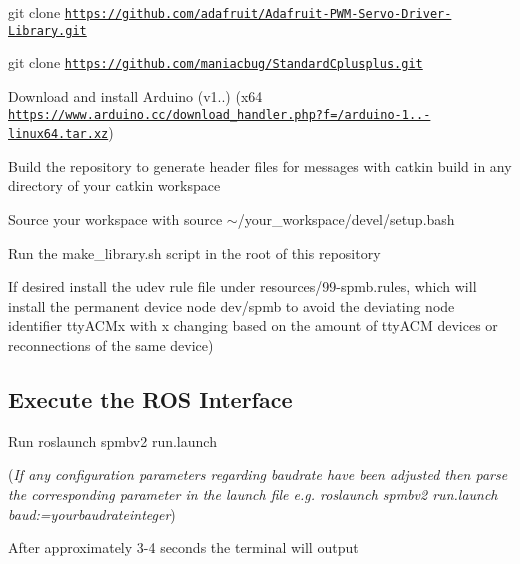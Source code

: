 \begin{DoxyItemize}
\item {\ttfamily git clone \href{https://github.com/adafruit/Adafruit-PWM-Servo-Driver-Library.git}{\tt https\+://github.\+com/adafruit/\+Adafruit-\/\+P\+W\+M-\/\+Servo-\/\+Driver-\/\+Library.\+git}}
\item {\ttfamily git clone \href{https://github.com/maniacbug/StandardCplusplus.git}{\tt https\+://github.\+com/maniacbug/\+Standard\+Cplusplus.\+git}}
\item Download and install Arduino (v1..) (x64 \href{https://www.arduino.cc/download_handler.php?f=/arduino-1.8.5-linux64.tar.xz}{\tt https\+://www.\+arduino.\+cc/download\+\_\+handler.\+php?f=/arduino-\/1..-\/linux64.\+tar.\+xz})
\item Build the repository to generate header files for messages with {\ttfamily catkin build} in any directory of your catkin workspace
\item Source your workspace with {\ttfamily source $\sim$/your\+\_\+workspace/devel/setup.bash}
\item Run the {\ttfamily make\+\_\+library.\+sh} script in the root of this repository
\item If desired install the udev rule file under {\ttfamily resources/99-\/spmb.\+rules}, which will install the permanent device node {\ttfamily dev/spmb} to avoid the deviating node identifier tty\+A\+C\+Mx with x changing based on the amount of tty\+A\+CM devices or reconnections of the same device)
\end{DoxyItemize}

\subsection*{Execute the R\+OS Interface}


\begin{DoxyItemize}
\item Run {\ttfamily roslaunch spmbv2 run.\+launch}
\end{DoxyItemize}

({\itshape If any configuration parameters regarding baudrate have been adjusted then parse the corresponding parameter in the launch file e.\+g. {\ttfamily roslaunch spmbv2 run.\+launch baud\+:=yourbaudrateinteger}})


\begin{DoxyItemize}
\item After approximately 3-\/4 seconds the terminal will output
\end{DoxyItemize}


